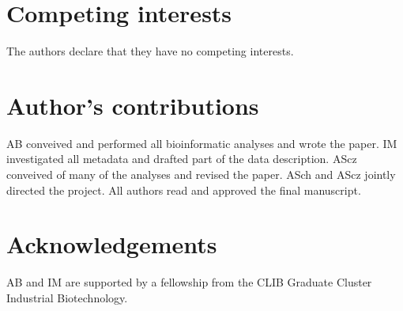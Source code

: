 \documentclass{bmcart}
\begin{document}
\newpage
\begin{backmatter}

\section*{Competing interests}
The authors declare that they have no competing interests.

\section*{Author's contributions}
AB conveived and performed all bioinformatic analyses and wrote the paper.
IM investigated all metadata and drafted part of the data description.
AScz conveived of many of the analyses and revised the paper.
ASch and AScz jointly directed the project.
All authors read and approved the final manuscript.

\section*{Acknowledgements}
AB and IM are supported by a fellowship from the CLIB Graduate Cluster Industrial Biotechnology.




\end{backmatter}
\end{document}
